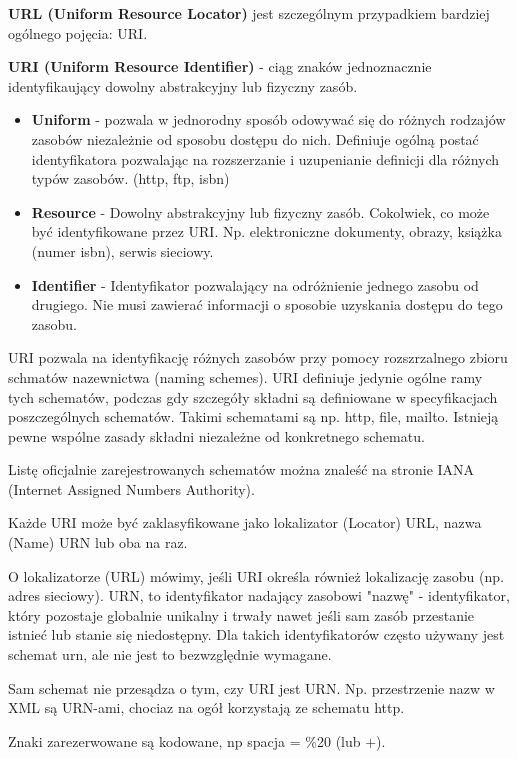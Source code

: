 \documentclass[../main.tex]{subfiles}
\begin{document}
    \textbf{URL (Uniform Resource Locator)} jest szczególnym przypadkiem bardziej ogólnego pojęcia: URI.

    \textbf{URI (Uniform Resource Identifier)} - ciąg znaków jednoznacznie identyfikaujący dowolny abstrakcyjny lub fizyczny zasób.
    \begin{itemize}
        \item \textbf{Uniform} - pozwala w jednorodny sposób odowywać się do różnych rodzajów zasobów niezależnie od sposobu dostępu do nich. Definiuje ogólną postać identyfikatora pozwalając na rozszerzanie i uzupenianie definicji dla różnych typów zasobów. (http, ftp, isbn)
        \item \textbf{Resource} - Dowolny abstrakcyjny lub fizyczny zasób. Cokolwiek, co może być identyfikowane przez URI. Np. elektroniczne dokumenty, obrazy, książka (numer isbn), serwis sieciowy.
        \item \textbf{Identifier} - Identyfikator pozwalający na odróżnienie jednego zasobu od drugiego. Nie musi zawierać informacji o sposobie uzyskania dostępu do tego zasobu.
    \end{itemize}
    URI pozwala na identyfikację różnych zasobów przy pomocy rozszrzalnego zbioru schmatów nazewnictwa (naming schemes).
    URI definiuje jedynie ogólne ramy tych schematów, podczas gdy szczegóły składni są definiowane w specyfikacjach
    poszczególnych schematów. Takimi schematami są np. http, file, mailto. Istnieją pewne wspólne zasady składni
    niezależne od konkretnego schematu.

    Listę oficjalnie zarejestrowanych schematów można znaleść na stronie IANA (Internet Assigned Numbers Authority).


    Każde URI może być zaklasyfikowane jako lokalizator (Locator) URL, nazwa (Name) URN lub oba na raz.

    O lokalizatorze (URL) mówimy, jeśli URI określa również lokalizację zasobu (np. adres sieciowy).
    URN, to identyfikator nadający zasobowi "nazwę" - identyfikator, który pozostaje globalnie unikalny i trwały nawet jeśli sam zasób przestanie istnieć lub stanie się niedostępny. Dla takich identyfikatorów często używany jest schemat urn, ale nie jest to bezwzględnie wymagane.

    Sam schemat nie przesądza o tym, czy URI jest URN. Np. przestrzenie nazw w XML są URN-ami, chociaz na ogół korzystają ze schematu http.

    Znaki zarezerwowane są kodowane, np spacja = \%20 (lub $+$).
\end{document}
